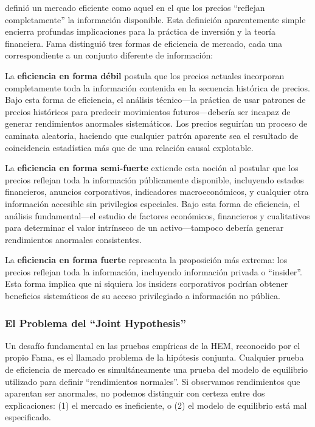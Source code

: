 \documentclass[11pt,a4paper]{article}
\begin{document}
\citet{fama1970} definió un mercado eficiente como aquel en el que los precios ``reflejan completamente'' la información disponible. Esta definición aparentemente simple encierra profundas implicaciones para la práctica de inversión y la teoría financiera. Fama distinguió tres formas de eficiencia de mercado, cada una correspondiente a un conjunto diferente de información:

La \textbf{eficiencia en forma débil} postula que los precios actuales incorporan completamente toda la información contenida en la secuencia histórica de precios. Bajo esta forma de eficiencia, el análisis técnico---la práctica de usar patrones de precios históricos para predecir movimientos futuros---debería ser incapaz de generar rendimientos anormales sistemáticos. Los precios seguirían un proceso de caminata aleatoria, haciendo que cualquier patrón aparente sea el resultado de coincidencia estadística más que de una relación causal explotable.

La \textbf{eficiencia en forma semi-fuerte} extiende esta noción al postular que los precios reflejan toda la información públicamente disponible, incluyendo estados financieros, anuncios corporativos, indicadores macroeconómicos, y cualquier otra información accesible sin privilegios especiales. Bajo esta forma de eficiencia, el análisis fundamental---el estudio de factores económicos, financieros y cualitativos para determinar el valor intrínseco de un activo---tampoco debería generar rendimientos anormales consistentes.

La \textbf{eficiencia en forma fuerte} representa la proposición más extrema: los precios reflejan toda la información, incluyendo información privada o ``insider''. Esta forma implica que ni siquiera los insiders corporativos podrían obtener beneficios sistemáticos de su acceso privilegiado a información no pública.

\subsubsection{El Problema del ``Joint Hypothesis''}

Un desafío fundamental en las pruebas empíricas de la HEM, reconocido por el propio Fama, es el llamado problema de la hipótesis conjunta. Cualquier prueba de eficiencia de mercado es simultáneamente una prueba del modelo de equilibrio utilizado para definir ``rendimientos normales''. Si observamos rendimientos que aparentan ser anormales, no podemos distinguir con certeza entre dos explicaciones: (1) el mercado es ineficiente, o (2) el modelo de equilibrio está mal especificado.
\end{document}
